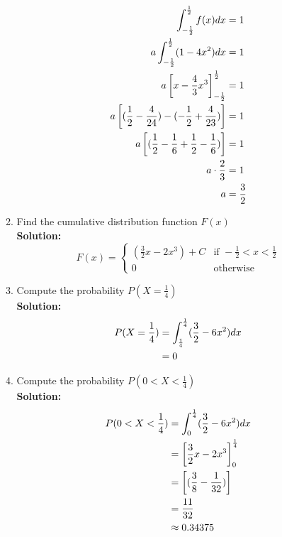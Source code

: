 \documentclass[a4paper]{article}
\begin{document}
\begin{enumerate}
\begin{enumerate}
\begin{align}
	\int_{-\frac{1}{2}}^{\frac{1}{2}}f(x)dx &= 1\notag\\
	a \int_{-\frac{1}{2}}^{\frac{1}{2}} (1 - 4x^2)dx &= 1\notag\\
	a \left[ x - \frac{4}{3}x^3\right]_{-\frac{1}{2}}^\frac{1}{2} &= 1\notag\\
	a \left[ (\frac{1}{2} - \frac{4}{24}) - (- \frac{1}{2} + \frac{4}{23})\right] &= 1\notag\\
	a \left[ (\frac{1}{2} - \frac{1}{6} + \frac{1}{2} - \frac{1}{6})\right] &= 1\notag\\
	a \cdot \frac{2}{3} &= 1\notag\\
	a &= \frac{3}{2}\notag
\end{align}		
		
		
		
	
	\item Find the cumulative distribution function $F(x)$\\
	\textbf{Solution:}\\

\[
 F(x) = 
  \begin{cases} 
    (\frac{3}{2}x - 2x^3) + C & \text{if } -\frac{1}{2} < x < \frac{1}{2}\\
   0 & \text{otherwise}
  \end{cases}
\]
\vspace{1em}

	

	\item Compute the probability $P(X = \frac{1}{4})$\\
	\textbf{Solution:}\\

\begin{align}
	P(X = \frac{1}{4}) &= \int_\frac{1}{4}^\frac{1}{4} (\frac{3}{2} - 6x^2)dx\notag\\
	&= 0\notag
\end{align}
\vspace{1em}




	\item Compute the probability $P(0 < X < \frac{1}{4})$\\
	\textbf{Solution:}\\
	
\begin{align}
	P(0 < X < \frac{1}{4}) &= \int_0^\frac{1}{4} (\frac{3}{2} - 6x^2)dx\notag\\
	&= \left[ \frac{3}{2}x - 2x^3 \right]_0^\frac{1}{4}\notag\\
	&= \left[ (\frac{3}{8} - \frac{1}{32})\right]\notag\\
	&= \frac{11}{32}\notag\\
	&\approx 0.34375\notag
\end{align}	
	

\end{enumerate}
\end{enumerate}
\end{document}
